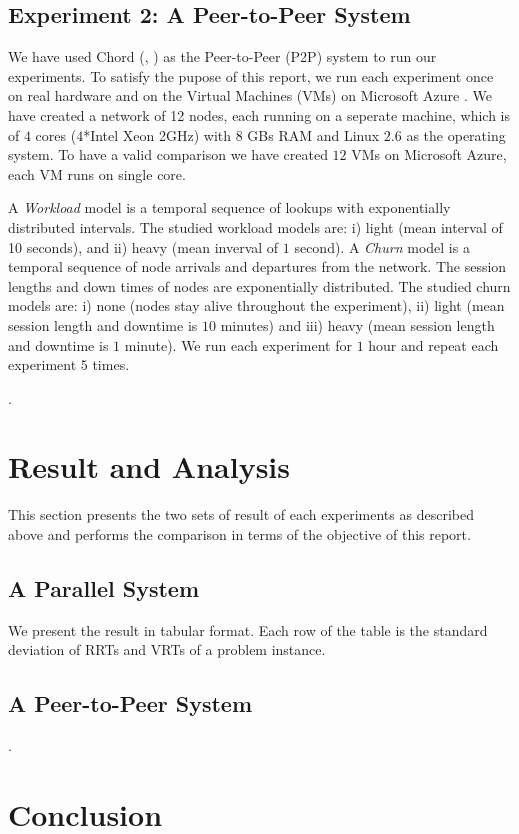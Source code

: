 \subsection*{Experiment 2: A Peer-to-Peer System}
We have used Chord (\cite{chord1}, \cite{chord2}) as the Peer-to-Peer (P2P) system to run our experiments. To satisfy the pupose of this report, we run each experiment once on real hardware and on the Virtual Machines (VMs) on Microsoft Azure \cite{azure}. We have created a network of 12 nodes, each running on a seperate machine, which is of $4$ cores ($4$*Intel Xeon 2GHz) with $8$ GBs RAM and Linux $2.6$ as the operating system. To have a valid comparison we have created $12$ VMs on Microsoft Azure, each VM runs on single core. 

A \emph{Workload} model is a temporal sequence of lookups with exponentially distributed intervals. The studied workload models are: i) light (mean interval of 10 seconds), and ii) heavy (mean inverval of $1$ second). A \emph{Churn} model is a temporal sequence of node arrivals and departures from the network. The session lengths and down times of nodes are exponentially distributed. The studied churn models are: i) none (nodes stay alive throughout the experiment), ii) light (mean session length and downtime is $10$ minutes) and iii) heavy (mean session length and downtime is $1$ minute). We run each experiment for $1$ hour and repeat each experiment $5$ times. 


.\section*{Result and Analysis}
This section presents the two sets of result of each experiments as described above and performs the comparison in terms of the objective of this report. 

\subsection*{A Parallel System}
We present the result in tabular format. Each row of the table is the standard deviation of RRTs and VRTs of a problem instance. 

\subsection*{A Peer-to-Peer System}




.\section*{Conclusion}
